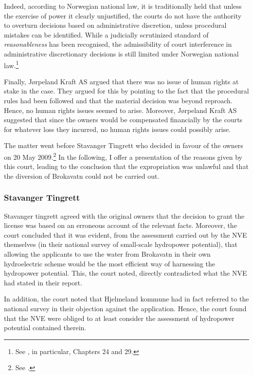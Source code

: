 Indeed, according to Norwegian national law, it is traditionally held that unless the exercise of power it clearly unjustified, the courts do not have the authority to overturn decisions based on administrative discretion, unless procedural mistakes can be identified. While a judicially scrutinized standard of \emph{reasonableness} has been recognised, the admissibility of court interference in administrative discretionary decisions is still limited under Norwegian national law.\footnote{See \cite{eckhoff14}, in particular, Chapters 24 and 29.}

Finally, Jørpeland Kraft AS argued that there was no issue of human rights at stake in the case. They argued for this by pointing to the fact that the procedural rules had been followed and that the material decision was beyond reproach. Hence, no human rights issues seemed to arise. Moreover, Jørpeland Kraft AS suggested that since the owners would be compensated financially by the courts for whatever loss they incurred, no human rights issues could possibly arise.

The matter went before Stavanger Tingrett who decided in favour of the owners on 20 May 2009.\footnote{See \cite{jorpeland09}.} In the following, I offer a presentation of the reasons given by this court, leading to the conclusion that the expropriation was unlawful and that the diversion of Brokavatn could not be carried out.

\subsubsection{Stavanger Tingrett}

Stavanger tingrett agreed with the original owners that the decision to grant the license was based on an erroneous account of the relevant facts. Moreover, the court concluded that it was evident, from the assessment carried out by the NVE themselves (in their national survey of small-scale hydropower potential), that allowing the applicants to use the water from Brokavatn in their own hydroelectric scheme would be the most efficient way of harnessing the hydropower potential. This, the court noted, directly contradicted what the NVE had stated in their report.

In addition, the court noted that Hjelmeland kommune had in fact referred to the national survey in their objection against the application. Hence, the court found that the NVE were obliged to at least consider the assessment of hydropower potential contained therein.

